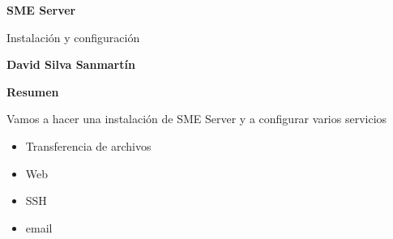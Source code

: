 \thispagestyle{empty}
\begin{center}
    \Large
    \textbf{SME Server}
    
    \vspace{0.4cm}
    \large
    Instalación y configuración
    
    \vspace{0.4cm}
    \textbf{David Silva Sanmartín}
    
    \vspace{0.9cm}
    \textbf{Resumen}
\end{center}
Vamos a hacer una instalación de SME Server y a configurar varios servicios
\begin{itemize}
\item Transferencia de archivos
\item Web
\item SSH
\item email
\end{itemize}
